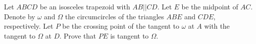 Let $ABCD$ be an isosceles trapezoid with $ AB || CD $.  Let $E$ be the midpoint of $AC$. Denote by $\omega$ and $\Omega$ the circumcircles of the triangles $ABE$ and $CDE$, respectively. Let $P$ be the crossing point of the tangent to $\omega$ at $A$ with the tangent to $\Omega$ at $D$. Prove that $PE$ is tangent to $\Omega$.